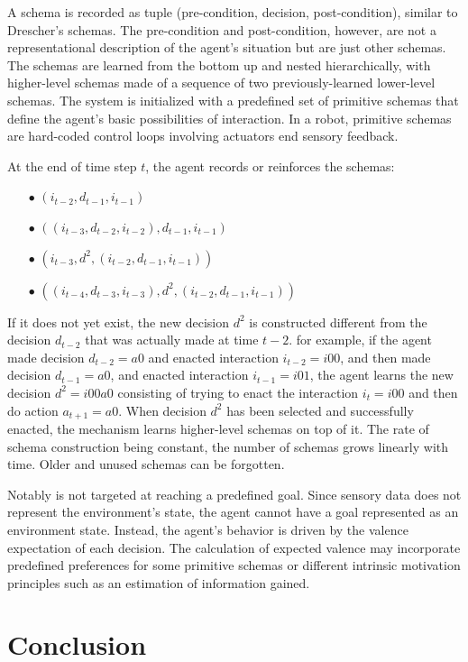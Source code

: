 \documentclass[runningheads]{llncs}
\begin{document}
A schema is recorded as tuple (pre-condition, decision, post-condition), similar to Drescher's schemas.
The pre-condition and post-condition, however, are not a representational description of the agent's situation but are just other schemas. 
The schemas are learned from the bottom up and nested hierarchically, with higher-level schemas made of a sequence of two previously-learned lower-level schemas. 
The system is initialized with a predefined set of primitive schemas that define the agent's basic possibilities of interaction. 
In a robot, primitive schemas are hard-coded control loops involving actuators end sensory feedback. 

At the end of time step $t$, the agent records or reinforces the schemas: 
\begin{itemize}
	\item[$\bullet$] $(i_{t-2}, d_{t-1}, i_{t-1})$
	\item[$\bullet$] $((i_{t-3}, d_{t-2}, i_{t-2}), d_{t-1}, i_{t-1})$
	\item[$\bullet$] $(i_{t-3}, d^2, (i_{t-2}, d_{t-1}, i_{t-1}))$
	\item[$\bullet$] $((i_{t-4}, d_{t-3}, i_{t-3}), d^2, (i_{t-2}, d_{t-1}, i_{t-1}))$
\end{itemize}

If it does not yet exist, the new decision $d^2$ is constructed different from the decision $d_{t-2}$ that was actually made at time $t-2$. 
for example, if the agent made decision $d_{t-2} = a0$ and enacted interaction $i_{t-2}=i00$, and then made decision $d_{t-1} = a0$, and enacted interaction $i_{t-1}=i01$, the agent learns the new decision $d^2=i00a0$ consisting of trying to enact the interaction $i_t=i00$ and then do action $a_{t+1}=a0$. 
When decision $d^2$ has been selected and successfully enacted, the mechanism learns higher-level schemas on top of it. 
The rate of schema construction being constant, the number of schemas grows linearly with time. 
Older and unused schemas can be forgotten.

Notably is not targeted at reaching a predefined goal. Since sensory data does not represent the environment's state, the agent cannot have a goal represented as an environment state. Instead, the agent's behavior is driven by the valence expectation of each decision. 
The calculation of expected valence may incorporate predefined preferences for some primitive schemas or different intrinsic motivation principles such as an estimation of information gained. 


\section{Conclusion}
\end{document}
